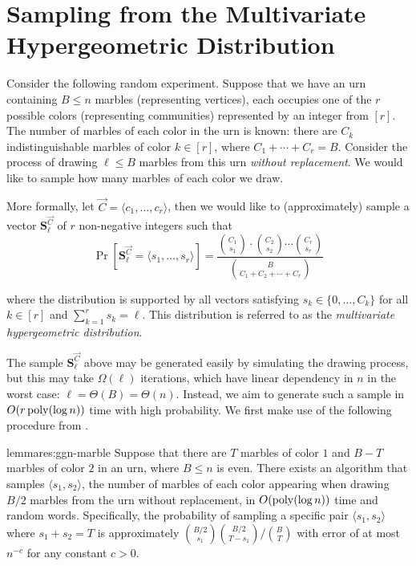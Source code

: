 \section{Sampling from the Multivariate Hypergeometric Distribution}
\label{sec:multivariate_hypergeometric_sampling}

Consider the following random experiment. Suppose that we have an urn containing $B \leq n$ marbles (representing vertices), each occupies one of the $r$ possible colors (representing communities) represented by an integer from $[r]$. The number of marbles of each color in the urn is known: there are $C_k$ indistinguishable marbles of color $k \in [r]$, where $C_1 + \cdots + C_r = B$. Consider the process of drawing $\ell \leq B$ marbles from this urn \emph{without replacement}. We would like to sample how many marbles of each color we draw.

More formally, let $\vec{C} = \langle c_1, \ldots, c_r \rangle$, then we would like to (approximately) sample a vector $\mathbf{S}^\vec{C}_\ell$ of $r$ non-negative integers such that
\[\Pr[\mathbf{S}^\vec{C}_\ell = \langle s_1, \ldots, s_r \rangle]
= \frac{{C_1\choose s_1}\cdot{C_2\choose s_2}\cdots{C_r\choose s_r}}{{B \choose C_1+C_2+ \cdots +C_r}}\]

where the distribution is supported by all vectors satisfying $s_k \in \{0, \ldots, C_k\}$ for all $k \in [r]$ and $\sum_{k=1}^{r} s_k = \ell$. This distribution is referred to as the \emph{multivariate hypergeometric distribution}.

The sample $\mathbf{S}^\vec{C}_\ell$ above may be generated easily by simulating the drawing process, but this may take $\Omega(\ell)$ iterations, which have linear dependency in $n$ in the worst case: $\ell = \Theta(B) = \Theta(n)$. Instead, we aim to generate such a sample in $O(r\,\mathrm{poly}(\log n))$ time with high probability. We first make use of the following procedure from \cite{huge}.

\begin{restatable}{lemma}{res:ggn-marble}\label{lem:ggn_interval_summable}
Suppose that there are $T$ marbles of color $1$ and $B-T$ marbles of color $2$ in an urn,
where $B \leq n$ is even. There exists an algorithm that samples $\langle s_1, s_2 \rangle$,
the number of marbles of each color appearing when drawing $B/2$ marbles from the urn without replacement,
in $O(\mathrm{poly}(\log n))$ time and random words.
Specifically, the probability of sampling a specific pair $\langle s_1, s_2 \rangle$ where $s_1 + s_2 = T$
is approximately ${B/2 \choose s_1}{B/2 \choose T-s_1}/{B \choose T}$ with error of at most $n^{-c}$ for any constant $c>0$.
\end{restatable}

